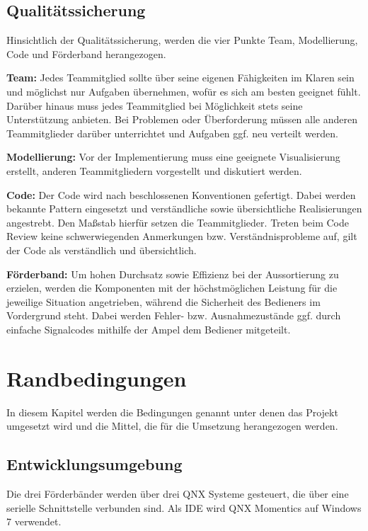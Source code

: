 \documentclass[a4paper, 11pt]{article}
\begin{document}
\subsection{Qualitätssicherung}
Hinsichtlich der Qualitätssicherung, werden die vier Punkte Team, Modellierung, Code und Förderband herangezogen.
\medskip
\begin{compactenum}[1.]
\item \textbf{Team:} Jedes Teammitglied sollte über seine eigenen Fähigkeiten im Klaren sein und möglichst nur Aufgaben übernehmen, wofür es sich am besten geeignet fühlt. Darüber hinaus muss jedes Teammitglied bei Möglichkeit stets seine Unterstützung anbieten. Bei Problemen oder Überforderung müssen alle anderen Teammitglieder darüber unterrichtet und Aufgaben ggf. neu verteilt werden.
\medskip
\item \textbf{Modellierung:} Vor der Implementierung muss eine geeignete Visualisierung erstellt, anderen Teammitgliedern vorgestellt und diskutiert werden. 
\medskip
\item \textbf{Code:} Der Code wird nach beschlossenen Konventionen gefertigt. Dabei werden bekannte Pattern eingesetzt und verständliche sowie übersichtliche Realisierungen angestrebt. Den Maßstab hierfür setzen die Teammitglieder. Treten beim Code Review keine schwerwiegenden Anmerkungen bzw. Verständnisprobleme auf, gilt der Code als verständlich und übersichtlich.
\medskip
\item \textbf{Förderband:} Um hohen Durchsatz sowie Effizienz bei der Aussortierung zu erzielen, werden die Komponenten mit der höchstmöglichen Leistung für die jeweilige Situation angetrieben, während die Sicherheit des Bedieners im Vordergrund steht. Dabei werden Fehler- bzw. Ausnahmezustände ggf. durch einfache Signalcodes mithilfe der Ampel dem Bediener mitgeteilt.
\end{compactenum}

\section{Randbedingungen}
In diesem Kapitel werden die Bedingungen genannt unter denen das Projekt umgesetzt wird und die Mittel, die für die Umsetzung herangezogen werden.

\subsection{Entwicklungsumgebung}
Die drei Förderbänder werden über drei QNX Systeme gesteuert, die über eine serielle Schnittstelle verbunden sind. Als IDE wird QNX Momentics auf Windows 7 verwendet.
\end{document}
